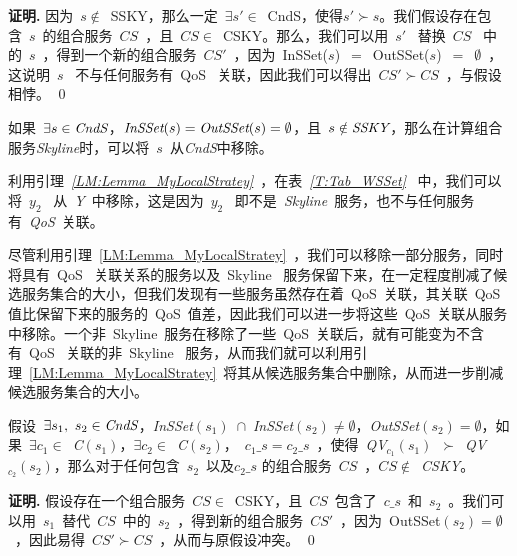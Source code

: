 \textbf{证明.} 因为~$s \notin$~SSKY，那么一定~$\exists s' \in$~CndS，使得$s' \succ s$。我们假设存在包含~$s$~的组合服务~$CS$~，且~$CS \in$~CSKY。那么，我们可以用~$s'$~ 替换~$CS$~ 中的~$s$~，得到一个新的组合服务~$CS'$~，因为~InSSet($s$)~$=$~OutSSet($s$)~$=$~$\emptyset$~，这说明~$s$~ 不与任何服务有~QoS~ 关联，因此我们可以得出~$CS' \succ CS$~，与假设相悖。
\qed

\begin{lemma}\label{LM:Lemma_MyLocalStratey}

如果~$\exists s \in \emph{CndS}$，$\emph{InSSet}(s)=\emph{OutSSet}(s)=\emptyset$，且~$s \notin \emph{SSKY}$，那么在计算组合服务\emph{Skyline}时，可以将~$s$~从\emph{CndS}中移除。

\end{lemma}

\begin{example}

利用引理~\emph{\ref{LM:Lemma_MyLocalStratey}}~，在表~\emph{\ref{T:Tab_WSSet}}~ 中，我们可以将~$y_{2}$~ 从~\emph{Y}~中移除，这是因为~$y_{2}$~ 即不是~\emph{Skyline}~服务，也不与任何服务有~\emph{QoS}~关联。

\end{example}

尽管利用引理~\ref{LM:Lemma_MyLocalStratey}~，我们可以移除一部分服务，同时将具有~QoS~ 关联关系的服务以及~Skyline~ 服务保留下来，在一定程度削减了候选服务集合的大小，但我们发现有一些服务虽然存在着~QoS~关联，其关联~QoS~ 值比保留下来的服务的~QoS~值差，因此我们可以进一步将这些~QoS~关联从服务中移除。一个非~Skyline~服务在移除了一些~QoS~关联后，就有可能变为不含有~QoS~ 关联的非~Skyline~ 服务，从而我们就可以利用引理~\ref{LM:Lemma_MyLocalStratey}~将其从候选服务集合中删除，从而进一步削减候选服务集合的大小。


\begin{theorem}\label{TH:Theo_Rule2}

假设~$\exists s_{1},\ s_{2} \in \emph{CndS}$，\emph{InSSet}$(s_{1})$~$\cap$~\emph{InSSet}$(s_{2}) \neq \emptyset$，\emph{OutSSet}$(s_{2})=\emptyset$，如果~$\exists c_{1} \in$~\emph{C}$(s_{1})$，$\exists c_{2} \in$~\emph{C}$(s_{2})$，~$c_{1}\_s = c_{2}\_s$~，使得~\emph{QV}$_{c_{1}}(s_{1})$~$\succ$~\emph{QV}$_{c_{2}}(s_{2})$，那么对于任何包含~$s_{2}$~以及$c_{2}\_{s}$ 的组合服务~$CS$~，$CS\notin$~\emph{CSKY}。

\end{theorem}

\textbf{证明.} 假设存在一个组合服务~$CS \in$~CSKY，且~$CS$~包含了~$c\_s$~和~$s_{2}$~。我们可以用~$s_{1}$~替代~$CS$~中的~$s_{2}$~，得到新的组合服务~$CS'$~，因为~OutSSet$(s_{2})=\emptyset$~，因此易得~$CS' \succ CS$~，从而与原假设冲突。
\qed

